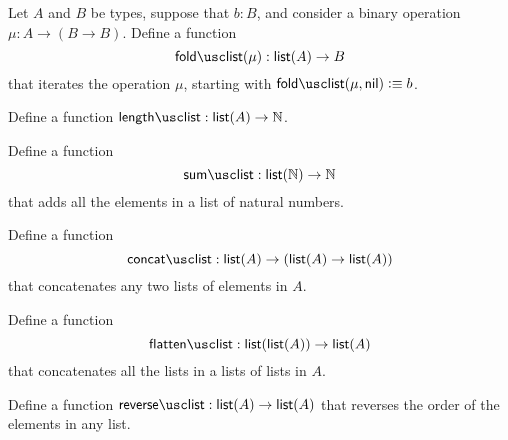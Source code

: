 \begin{exercises}
\begin{subexenum}
  \item Let $A$ and $B$ be types, suppose that $b:B$, and consider a binary operation $\mu:A\to (B \to B)$. Define a function
    \begin{equation*}
      \foldlist(\mu) : \lst(A)\to B
    \end{equation*}
    that iterates the operation $\mu$, starting with $\foldlist(\mu,\nil)\defeq b$.
  \item Define a function $\lengthlist:\lst(A)\to\N$.
  \item Define a function
    \begin{equation*}
      \sumlist : \lst(\N) \to \N
    \end{equation*}
    that adds all the elements in a list of natural numbers.
  \item Define a function
    \begin{equation*}
      \concatlist : \lst(A) \to (\lst(A) \to \lst(A))
    \end{equation*}
    that concatenates any two lists of elements in $A$.
  \item Define a function
    \begin{equation*}
      \flattenlist : \lst(\lst(A)) \to \lst(A)
    \end{equation*}
    that concatenates all the lists in a lists of lists in $A$.
  \item Define a function $\reverselist : \lst(A) \to \lst(A)$ that reverses the order of the elements in any list.
  \end{subexenum}
\end{exercises}

